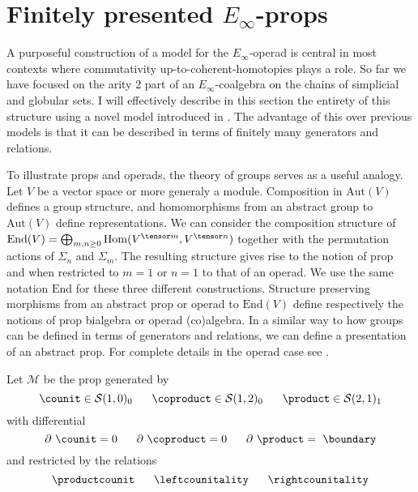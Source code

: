 
\section{Finitely presented $E_\infty$-props}

A purposeful construction of a model for the $E_\infty$-operad is central in most contexts where commutativity up-to-coherent-homotopies plays a role.
So far we have focused on the arity 2 part of an $E_\infty$-coalgebra on the chains of simplicial and globular sets.
I will effectively describe in this section the entirety of this structure using a novel model introduced in \cite{medina2020prop1}.
The advantage of this over previous models \cite{berger2004combinatorial, mcclure2003multivariable, kriz1995operads} is that it can be described in terms of finitely many generators and relations.

To illustrate props and operads, the theory of groups serves as a useful analogy.
Let $V$ be a vector space or more generaly a module.
Composition in $\mathrm{Aut}(V)$ defines a group structure, and homomorphisms from an abstract group to $\mathrm{Aut}(V)$ define representations.
We can consider the composition structure of $\mathrm{End}(V) = \bigoplus_{m,n \geq 0} \mathrm{Hom}(V^{\tensor m}, V^{\tensor n})$ together with the permutation actions of $\Sigma_n$ and $\Sigma_m$.
The resulting structure gives rise to the notion of prop and when restricted to $m = 1$ or $n = 1$ to that of an operad.
We use the same notation $\mathrm{End}$ for these three different constructions.
Structure preserving morphisms from an abstract prop or operad to $\mathrm{End}(V)$ define respectively the notions of prop bialgebra or operad (co)algebra.
In a similar way to how groups can be defined in terms of generators and relations, we can define a presentation of an abstract prop.
For complete details in the operad case see \cite{loday2012operads}.

\begin{definition}
	Let $\mathcal M$ be the prop generated by
	$$\counit \in \mathcal S(1,0)_0\hspace*{.6cm}\coproduct \in \mathcal S(1,2)_0\hspace*{.6cm} \product \in \mathcal S(2,1)_1$$
	with differential $$\partial\ \counit=0\hspace*{.6cm}\partial\ \coproduct=0\hspace*{.6cm}\partial\ \product=\ \boundary$$
	and restricted by the relations $$\productcounit\hspace*{.6cm}\leftcounitality\hspace*{.6cm}\rightcounitality$$
\end{definition}

